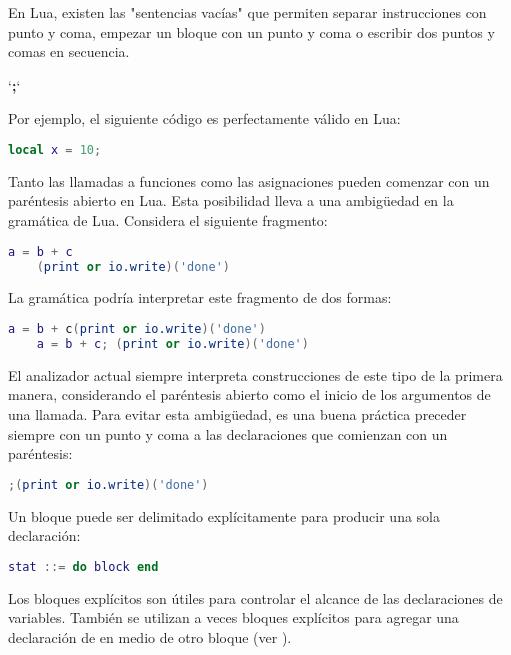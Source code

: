 \hspace{2cm} 

En Lua, existen las "sentencias vacías" que permiten separar instrucciones con punto y coma, empezar un bloque con un punto y coma o escribir dos puntos y comas en secuencia.

\hspace{2cm}  `\textbf{;}`

Por ejemplo, el siguiente código es perfectamente válido en Lua:

\begin{lstlisting}[language=Lua]
    local x = 10;
\end{lstlisting}

Tanto las llamadas a funciones como las asignaciones pueden comenzar con un paréntesis abierto en Lua. Esta posibilidad lleva a una ambigüedad en la gramática de Lua. Considera el siguiente fragmento:

\begin{lstlisting}[language=Lua]
    a = b + c
    (print or io.write)('done')
\end{lstlisting}

La gramática podría interpretar este fragmento de dos formas:

\begin{lstlisting}[language=Lua]
    a = b + c(print or io.write)('done')
    a = b + c; (print or io.write)('done')
\end{lstlisting}

El analizador actual siempre interpreta construcciones de este tipo de la primera manera, considerando el paréntesis abierto como el inicio de los argumentos de una llamada. Para evitar esta ambigüedad, es una buena práctica preceder siempre con un punto y coma a las declaraciones que comienzan con un paréntesis:

\begin{lstlisting}[language=Lua]
    ;(print or io.write)('done')
\end{lstlisting}

Un bloque puede ser delimitado explícitamente para producir una sola declaración:

\begin{lstlisting}[language=Lua]
    stat ::= do block end
\end{lstlisting}

Los bloques explícitos son útiles para controlar el alcance de las declaraciones de variables. También se utilizan a veces bloques explícitos para agregar una declaración de  en medio de otro bloque (ver ).

